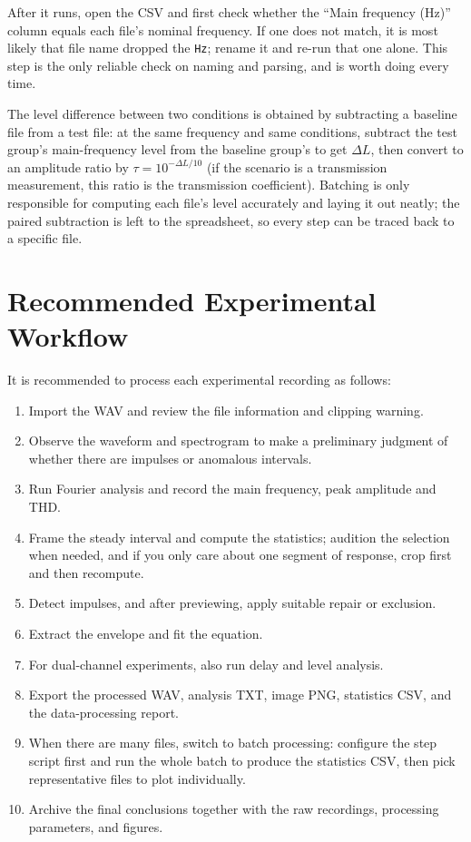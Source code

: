 \documentclass[UTF8,a4paper,12pt]{ctexart}
\begin{document}
After it runs, open the CSV and first check whether the ``Main frequency (Hz)'' column equals each file's nominal frequency. If one does not match, it is most likely that file name dropped the \texttt{Hz}; rename it and re-run that one alone. This step is the only reliable check on naming and parsing, and is worth doing every time.

The level difference between two conditions is obtained by subtracting a baseline file from a test file: at the same frequency and same conditions, subtract the test group's main-frequency level from the baseline group's to get $\Delta L$, then convert to an amplitude ratio by $\tau = 10^{-\Delta L/10}$ (if the scenario is a transmission measurement, this ratio is the transmission coefficient). Batching is only responsible for computing each file's level accurately and laying it out neatly; the paired subtraction is left to the spreadsheet, so every step can be traced back to a specific file.

\section{Recommended Experimental Workflow}


It is recommended to process each experimental recording as follows:

\begin{enumerate}
  \item Import the WAV and review the file information and clipping warning.
  \item Observe the waveform and spectrogram to make a preliminary judgment of whether there are impulses or anomalous intervals.
  \item Run Fourier analysis and record the main frequency, peak amplitude and THD.
  \item Frame the steady interval and compute the statistics; audition the selection when needed, and if you only care about one segment of response, crop first and then recompute.
  \item Detect impulses, and after previewing, apply suitable repair or exclusion.
  \item Extract the envelope and fit the equation.
  \item For dual-channel experiments, also run delay and level analysis.
  \item Export the processed WAV, analysis TXT, image PNG, statistics CSV, and the data-processing report.
  \item When there are many files, switch to batch processing: configure the step script first and run the whole batch to produce the statistics CSV, then pick representative files to plot individually.
  \item Archive the final conclusions together with the raw recordings, processing parameters, and figures.
\end{enumerate}
\end{document}
